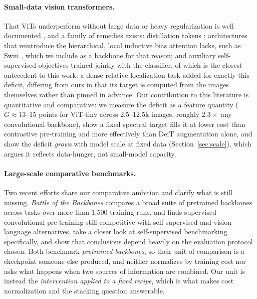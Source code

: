 \paragraph{Small-data vision transformers.}
That ViTs underperform without large data or heavy regularization is well
documented \citep{dosovitskiy2021vit,touvron2021deit},
and a family of remedies exists: distillation tokens
\citep{touvron2021deit}; architectures that reintroduce the hierarchical,
local inductive bias attention lacks, such as Swin \citep{liu2021swin},
which we include as a backbone for that reason; and auxiliary
self-supervised objectives trained jointly with the classifier, of which
\citet{liu2021efficientvit} is the closest antecedent to this work: a
dense relative-localization task added for exactly this deficit, differing
from ours in that its target is computed from the images themselves rather
than pinned in advance. Our contribution
to this literature is quantitative and comparative: we measure the deficit
as a feature quantity ($G \approx 13$--$15$ points for ViT-tiny across
$2.5$--$12.5$k images, roughly $2.3\times$ any convolutional backbone),
show a fixed spectral target fills it at lower cost than contrastive
pre-training and more effectively than DeiT augmentation alone, and show
the deficit \emph{grows} with model scale at fixed data
(Section~\ref{sec:scale}), which argues it reflects data-hunger, not small-model capacity.

\paragraph{Large-scale comparative benchmarks.}
Two recent efforts share our comparative ambition and clarify what is
still missing. \emph{Battle of the Backbones}
\citep{goldblum2023battle} compares a broad suite of pretrained
backbones across tasks over more than 1{,}500 training runs, and finds
supervised convolutional pre-training still competitive with
self-supervised and vision-language alternatives. \citet{marks2025closer}
take a closer look at self-supervised benchmarking specifically, and show
that conclusions depend heavily on the evaluation protocol chosen. Both
benchmark \emph{pretrained backbones}, so their unit of comparison is a
checkpoint someone else produced, and neither normalizes by training
cost nor asks what happens when two sources of information are combined.
Our unit is instead the \emph{intervention applied to a fixed recipe},
which is what makes cost normalization and the stacking question
answerable.

